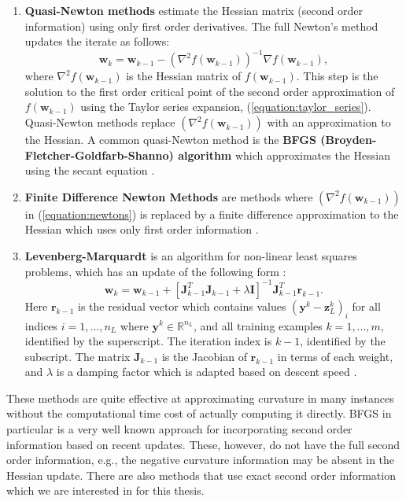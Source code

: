 \documentclass[letterpaper,12pt,titlepage,oneside,final]{book}
\begin{document}
	\begin{enumerate}
		\item{\textbf{Quasi-Newton methods} estimate the Hessian matrix (second order information) using only first order derivatives. The full Newton's method updates the iterate as follows:
			\begin{equation}
			\mathbf{w}_{k} = \mathbf{w}_{k-1} - (\nabla^{2}{f(\mathbf{w}_{k-1})})^{-1}\nabla{f(\mathbf{w}_{k-1})},
			\label{equation:newtons}
			\end{equation}
			where $\nabla^{2}{f(\mathbf{w}_{k-1})}$ is the Hessian matrix of $f(
			\mathbf{w}_{k-1})$. This step is the solution to the first order critical point of the second order approximation of $f(\mathbf{w}_{k-1})$ using the Taylor series expansion, (\ref{equation:taylor_series}). Quasi-Newton methods replace $(\nabla^{2}{f(\mathbf{w}_{k-1})})$ with an approximation to the Hessian. A common quasi-Newton method is the \textbf{BFGS (Broyden-Fletcher-Goldfarb-Shanno) algorithm} which approximates the Hessian using the secant equation \cite{Shepherd.1997}.  
		}
		\item{\textbf{Finite Difference Newton Methods} are methods where $(\nabla^{2}{f(\mathbf{w}_{k-1})})$ in (\ref{equation:newtons}) is replaced by a finite difference approximation to the Hessian which uses only first order information \cite{Shepherd.1997}.}
		\item{\textbf{Levenberg-Marquardt} is an algorithm for non-linear least squares problems, which has an update of the following form \cite{Shepherd.1997}:
			\begin{equation}
			\mathbf{w}_{k} = \mathbf{w}_{k-1} + [\mathbf{J}^{T}_{k-1}\mathbf{J}^{}_{k-1} + \lambda\mathbf{I}]^{-1}\mathbf{J}^{T}_{k-1}\mathbf{r}_{k-1}.
			\end{equation}    
			Here $\mathbf{r}_{k-1}$ is the residual vector which contains values $(\mathbf{y}^{k} - \mathbf{z}_{L}^{k})_{i}$ for all indices $i=1,...,n_{L}$ where $\mathbf{y}^{k} \in \mathbb{R}^{n_{L}}$, and all training examples $k = 1,...,m$, identified by the superscript. The iteration index is $k-1$, identified by the subscript. The matrix $\mathbf{J}_{k-1}$ is the Jacobian of $\mathbf{r}_{k-1}$ in terms of each weight, and $\lambda$ is a damping factor which is adapted based on descent speed \cite{Shepherd.1997}. }    
	\end{enumerate}
	These methods are quite effective at approximating curvature in many instances without the computational time cost of actually computing it directly. BFGS in particular is a very well known approach for incorporating second order information based on recent updates. These, however, do not have the full second order information, e.g., the negative curvature information may be absent in the Hessian update. There are also methods that use exact second order information which we are interested in for this thesis. 
\end{document}

